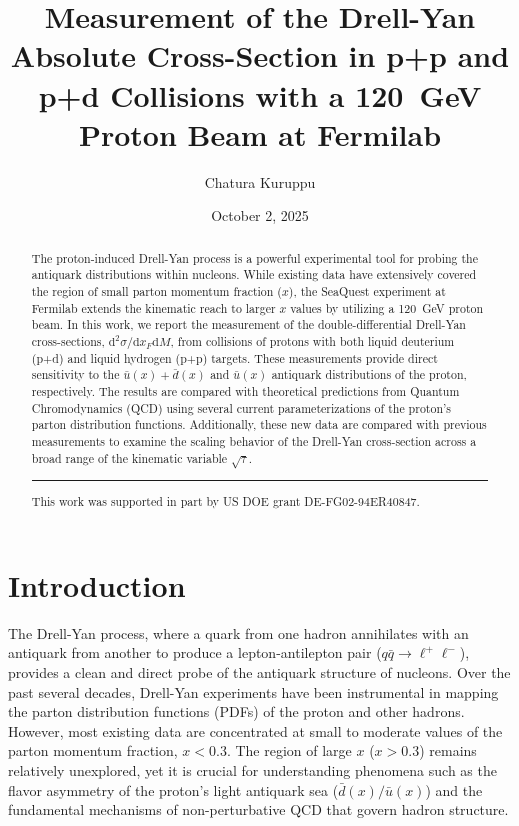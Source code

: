 \documentclass[11pt]{article}
\newcommand{\diffd}{\mathrm{d}}
\begin{document}
\title{\textbf{Measurement of the Drell-Yan Absolute Cross-Section in p+p and p+d Collisions with a \SI{120}{\giga\electronvolt} Proton Beam at Fermilab}}
\author[1]{Chatura Kuruppu}
\date{October 2, 2025}
\maketitle

\begin{abstract}
The proton-induced Drell-Yan process is a powerful experimental tool for probing the antiquark distributions within nucleons. While existing data have extensively covered the region of small parton momentum fraction ($x$), the SeaQuest experiment at Fermilab extends the kinematic reach to larger $x$ values by utilizing a \SI{120}{\giga\electronvolt} proton beam. In this work, we report the measurement of the double-differential Drell-Yan cross-sections, $\diffd^{2}\sigma/\diffd x_{F}\diffd M$, from collisions of protons with both liquid deuterium (p+d) and liquid hydrogen (p+p) targets. These measurements provide direct sensitivity to the $\bar{u}(x) + \bar{d}(x)$ and $\bar{u}(x)$ antiquark distributions of the proton, respectively. The results are compared with theoretical predictions from Quantum Chromodynamics (QCD) using several current parameterizations of the proton's parton distribution functions. Additionally, these new data are compared with previous measurements to examine the scaling behavior of the Drell-Yan cross-section across a broad range of the kinematic variable $\sqrt{\tau}$.
\vspace{1em}
\hrule
\vspace{1em}
\footnotesize{This work was supported in part by US DOE grant DE-FG02-94ER40847.}
\end{abstract}

\clearpage

\tableofcontents
\clearpage
\listoffigures
\clearpage
\listoftables
\clearpage


\section{Introduction}
\label{sec:introduction}
The Drell-Yan process, where a quark from one hadron annihilates with an antiquark from another to produce a lepton-antilepton pair ($q\bar{q} \rightarrow \ell^+\ell^-$), provides a clean and direct probe of the antiquark structure of nucleons. Over the past several decades, Drell-Yan experiments have been instrumental in mapping the parton distribution functions (PDFs) of the proton and other hadrons. However, most existing data are concentrated at small to moderate values of the parton momentum fraction, $x < 0.3$. The region of large $x$ ($x>0.3$) remains relatively unexplored, yet it is crucial for understanding phenomena such as the flavor asymmetry of the proton's light antiquark sea ($\bar{d}(x)/\bar{u}(x)$) and the fundamental mechanisms of non-perturbative QCD that govern hadron structure.
\end{document}

